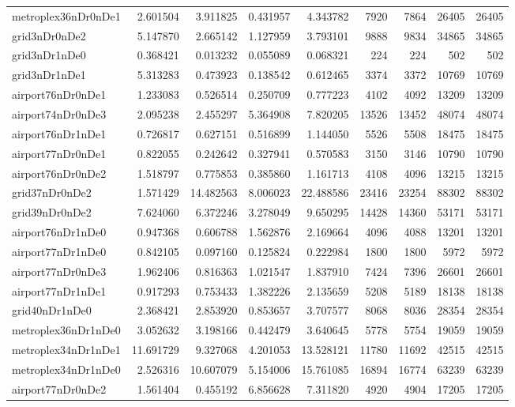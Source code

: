 \begin{longtable}{|l|r|r|r|r|r|r|r|r|}
metroplex36nDr0nDe1 & 2.601504 & 3.911825 & 0.431957 & 4.343782 & 7920 & 7864 & 26405 & 26405 \\
grid3nDr0nDe2 & 5.147870 & 2.665142 & 1.127959 & 3.793101 & 9888 & 9834 & 34865 & 34865 \\
grid3nDr1nDe0 & 0.368421 & 0.013232 & 0.055089 & 0.068321 & 224 & 224 & 502 & 502 \\
grid3nDr1nDe1 & 5.313283 & 0.473923 & 0.138542 & 0.612465 & 3374 & 3372 & 10769 & 10769 \\
airport76nDr0nDe1 & 1.233083 & 0.526514 & 0.250709 & 0.777223 & 4102 & 4092 & 13209 & 13209 \\
airport74nDr0nDe3 & 2.095238 & 2.455297 & 5.364908 & 7.820205 & 13526 & 13452 & 48074 & 48074 \\
airport76nDr1nDe1 & 0.726817 & 0.627151 & 0.516899 & 1.144050 & 5526 & 5508 & 18475 & 18475 \\
airport77nDr0nDe1 & 0.822055 & 0.242642 & 0.327941 & 0.570583 & 3150 & 3146 & 10790 & 10790 \\
airport76nDr0nDe2 & 1.518797 & 0.775853 & 0.385860 & 1.161713 & 4108 & 4096 & 13215 & 13215 \\
grid37nDr0nDe2 & 1.571429 & 14.482563 & 8.006023 & 22.488586 & 23416 & 23254 & 88302 & 88302 \\
grid39nDr0nDe2 & 7.624060 & 6.372246 & 3.278049 & 9.650295 & 14428 & 14360 & 53171 & 53171 \\
airport76nDr1nDe0 & 0.947368 & 0.606788 & 1.562876 & 2.169664 & 4096 & 4088 & 13201 & 13201 \\
airport77nDr1nDe0 & 0.842105 & 0.097160 & 0.125824 & 0.222984 & 1800 & 1800 & 5972 & 5972 \\
airport77nDr0nDe3 & 1.962406 & 0.816363 & 1.021547 & 1.837910 & 7424 & 7396 & 26601 & 26601 \\
airport77nDr1nDe1 & 0.917293 & 0.753433 & 1.382226 & 2.135659 & 5208 & 5189 & 18138 & 18138 \\
grid40nDr1nDe0 & 2.368421 & 2.853920 & 0.853657 & 3.707577 & 8068 & 8036 & 28354 & 28354 \\
metroplex36nDr1nDe0 & 3.052632 & 3.198166 & 0.442479 & 3.640645 & 5778 & 5754 & 19059 & 19059 \\
metroplex34nDr1nDe1 & 11.691729 & 9.327068 & 4.201053 & 13.528121 & 11780 & 11692 & 42515 & 42515 \\
metroplex34nDr1nDe0 & 2.526316 & 10.607079 & 5.154006 & 15.761085 & 16894 & 16774 & 63239 & 63239 \\
airport77nDr0nDe2 & 1.561404 & 0.455192 & 6.856628 & 7.311820 & 4920 & 4904 & 17205 & 17205 \\

\end{longtable}
